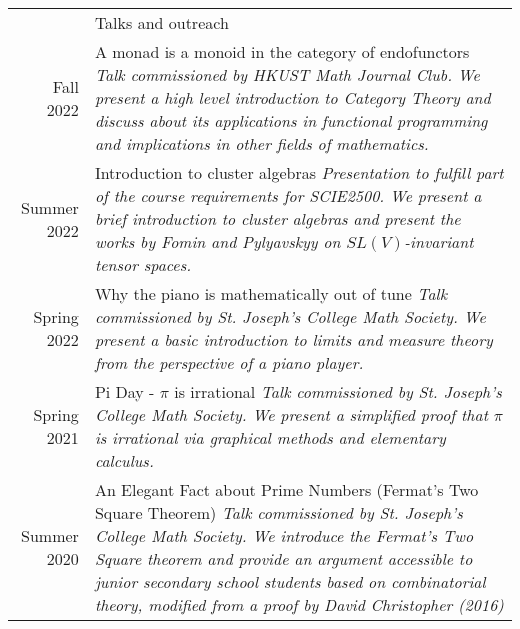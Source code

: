 \documentclass[letterpaper, 11pt]{article}
\newcommand{\headingfont}{\Large\color{OliveGreen}}
\newenvironment{SectionTable}[1]{
	\renewcommand*{\arraystretch}{1.7}
	\setlength{\tabcolsep}{10pt}
	\begin{longtable}{Rp{5.2in}} & #1 \\}
{\end{longtable}\vspace{-.3cm}}
\begin{document}
\begin{SectionTable}{\headingfont Talks and outreach}
Fall 2022 &
A monad is a monoid in the category of endofunctors
 \newline
\textit{Talk commissioned by HKUST Math Journal Club. We present a high level introduction to Category Theory and discuss about its applications in functional programming and implications in other fields of mathematics.} \\
Summer 2022 &
Introduction to cluster algebras
 \newline
\textit{Presentation to fulfill part of the course requirements for SCIE2500. We present a brief introduction to cluster algebras and present the works by Fomin and Pylyavskyy on \(SL(V)\)-invariant tensor spaces.} \\
Spring 2022 &
Why the piano is mathematically out of tune
\newline
\textit{Talk commissioned by St. Joseph's College Math Society. We present a basic introduction to limits and measure theory from the perspective of a piano player.} \\
Spring 2021 &
Pi Day - \(\pi\) is irrational \newline
\textit{Talk commissioned by St. Joseph's College Math Society. We present a simplified proof that \(\pi\) is irrational via graphical methods and elementary calculus.} \\
Summer 2020 &
An Elegant Fact about Prime Numbers (Fermat's Two Square Theorem) \newline
\textit{Talk commissioned by St. Joseph's College Math Society. We introduce the Fermat's Two Square theorem and provide an argument accessible to junior secondary school students based on combinatorial theory, modified from a proof by David Christopher (2016)} \\
\end{SectionTable}
\end{document}

